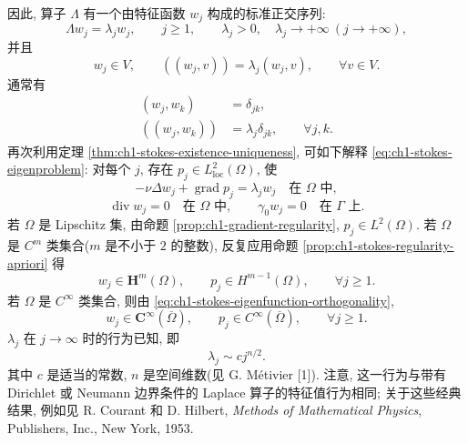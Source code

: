 因此, 算子 $\Lambda$ 有一个由特征函数 $w_j$ 构成的标准正交序列:
\[
\Lambda w_j=\lambda_jw_j,\qquad j\geq1,
\qquad\lambda_j>0,\quad\lambda_j\to+\infty\ (j\to+\infty),
\]
并且
\begin{equation}
w_j\in V,\qquad
((w_j,v))=\lambda_j(w_j,v),\qquad\forall v\in V.
\label{eq:ch1-stokes-eigenproblem}
\end{equation}
通常有
\begin{equation}
\begin{aligned}
(w_j,w_k)&=\delta_{jk},\\
((w_j,w_k))&=\lambda_j\delta_{jk},\qquad\forall j,k.
\end{aligned}
\label{eq:ch1-stokes-eigenfunction-orthogonality}
\end{equation}
再次利用定理 \ref{thm:ch1-stokes-existence-uniqueness}, 可如下解释 \eqref{eq:ch1-stokes-eigenproblem}: 对每个 $j$, 存在 $p_j\in L^2_{\mathrm{loc}}(\Omega)$, 使
\[
-\nu\Delta w_j+\operatorname{grad}p_j=\lambda_jw_j
\quad\text{在 }\Omega\text{ 中},
\]
\[
\operatorname{div}w_j=0\quad\text{在 }\Omega\text{ 中},
\qquad
\gamma_0w_j=0\quad\text{在 }\Gamma\text{ 上}.
\]
若 $\Omega$ 是 Lipschitz 集, 由命题 \ref{prop:ch1-gradient-regularity}, $p_j\in L^2(\Omega)$. 若 $\Omega$ 是 $C^m$ 类集合($m$ 是不小于 $2$ 的整数), 反复应用命题 \ref{prop:ch1-stokes-regularity-apriori} 得
\begin{equation}
w_j\in\mathbf H^m(\Omega),\qquad
p_j\in H^{m-1}(\Omega),\qquad\forall j\geq1.
\label{eq:ch1-stokes-eigenfunction-finite-regularity}
\end{equation}
若 $\Omega$ 是 $C^\infty$ 类集合, 则由 \eqref{eq:ch1-stokes-eigenfunction-orthogonality},
\begin{equation}
w_j\in\mathbf C^\infty(\overline\Omega),\qquad
p_j\in C^\infty(\overline\Omega),\qquad\forall j\geq1.
\label{eq:ch1-stokes-eigenfunction-smoothness}
\end{equation}
$\lambda_j$ 在 $j\to\infty$ 时的行为已知, 即
\begin{equation}
\lambda_j\sim c j^{n/2}.
\label{eq:ch1-stokes-eigenvalue-asymptotic}
\end{equation}
其中 $c$ 是适当的常数, $n$ 是空间维数(见 G. Métivier [1]). 注意, 这一行为与带有 Dirichlet 或 Neumann 边界条件的 Laplace 算子的特征值行为相同; 关于这些经典结果, 例如见 R. Courant 和 D. Hilbert, \emph{Methods of Mathematical Physics}, Publishers, Inc., New York, 1953.
